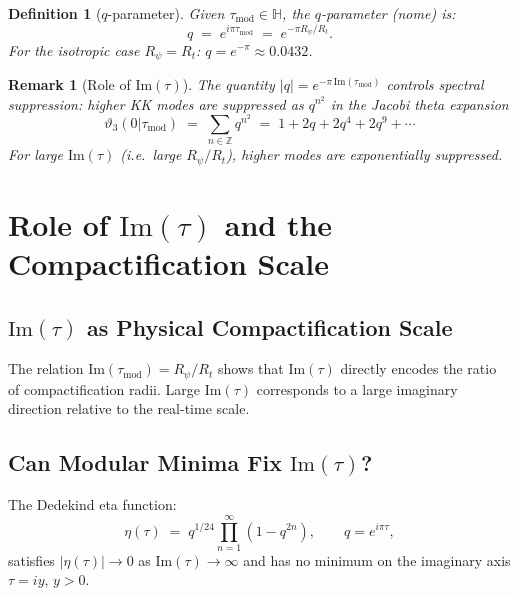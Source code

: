 \documentclass[11pt,a4paper]{article}
\newtheorem{definition}{Definition}
\newtheorem{remark}{Remark}
\begin{document}
\begin{definition}[$q$-parameter]
Given $\tau_{\mathrm{mod}} \in \mathbb{H}$, the $q$-parameter (nome) is:
\begin{equation}
  q \;=\; e^{i\pi\tau_{\mathrm{mod}}} \;=\; e^{-\pi R_\psi/R_t}.
\end{equation}
For the isotropic case $R_\psi = R_t$: $q = e^{-\pi} \approx 0.0432$.
\end{definition}

\begin{remark}[Role of $\mathrm{Im}(\tau)$]
The quantity $|q| = e^{-\pi\,\mathrm{Im}(\tau_{\mathrm{mod}})}$ controls
\emph{spectral suppression}: higher KK modes are suppressed as $q^{n^2}$
in the Jacobi theta expansion
\begin{equation}
  \vartheta_3(0|\tau_{\mathrm{mod}}) \;=\; \sum_{n \in \mathbb{Z}} q^{n^2}
    \;=\; 1 + 2q + 2q^4 + 2q^9 + \cdots
\end{equation}
For large $\mathrm{Im}(\tau)$ (i.e.\ large $R_\psi/R_t$), higher modes are
exponentially suppressed.
\end{remark}

\section{Role of $\mathrm{Im}(\tau)$ and the Compactification Scale}
\label{sec:im_tau}

\subsection{$\mathrm{Im}(\tau)$ as Physical Compactification Scale}

The relation $\mathrm{Im}(\tau_{\mathrm{mod}}) = R_\psi/R_t$ shows that
$\mathrm{Im}(\tau)$ directly encodes the ratio of compactification radii.
Large $\mathrm{Im}(\tau)$ corresponds to a large imaginary direction relative
to the real-time scale.

\subsection{Can Modular Minima Fix $\mathrm{Im}(\tau)$?}

The Dedekind eta function:
\begin{equation}
  \eta(\tau) \;=\; q^{1/24}\prod_{n=1}^{\infty}(1 - q^{2n}), \qquad q = e^{i\pi\tau},
\end{equation}
satisfies $|\eta(\tau)| \to 0$ as $\mathrm{Im}(\tau) \to \infty$ and has no
minimum on the imaginary axis $\tau = iy$, $y > 0$.
\end{document}
